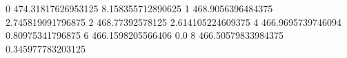 0 474.31817626953125 8.158355712890625
1 468.9056396484375 2.745819091796875
2 468.77392578125 2.614105224609375
4 466.9695739746094 0.80975341796875
6 466.1598205566406 0.0
8 466.50579833984375 0.345977783203125
